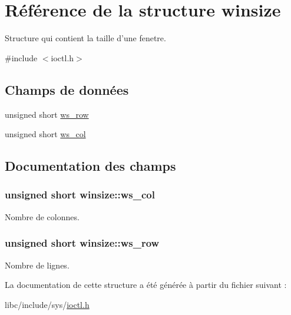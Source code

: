 \hypertarget{structwinsize}{\section{Référence de la structure winsize}
\label{structwinsize}
}


Structure qui contient la taille d'une fenetre.  




{\ttfamily \#include $<$ioctl.\-h$>$}

\subsection*{Champs de données}
\begin{DoxyCompactItemize}
\item 
unsigned short \hyperlink{structwinsize_a73698fa1d966374b0701e4bf225f0141}{ws\-\_\-row}
\item 
unsigned short \hyperlink{structwinsize_a80bedf71a49fd324e0d92d0702cc7005}{ws\-\_\-col}
\end{DoxyCompactItemize}


\subsection{Documentation des champs}
\hypertarget{structwinsize_a80bedf71a49fd324e0d92d0702cc7005}{
\subsubsection[{ws\-\_\-col}]{\setlength{\rightskip}{0pt plus 5cm}unsigned short winsize\-::ws\-\_\-col}}\label{structwinsize_a80bedf71a49fd324e0d92d0702cc7005}
Nombre de colonnes. \hypertarget{structwinsize_a73698fa1d966374b0701e4bf225f0141}{
\subsubsection[{ws\-\_\-row}]{\setlength{\rightskip}{0pt plus 5cm}unsigned short winsize\-::ws\-\_\-row}}\label{structwinsize_a73698fa1d966374b0701e4bf225f0141}
Nombre de lignes. 

La documentation de cette structure a été générée à partir du fichier suivant \-:\begin{DoxyCompactItemize}
\item 
libc/include/sys/\hyperlink{ioctl_8h}{ioctl.\-h}\end{DoxyCompactItemize}

